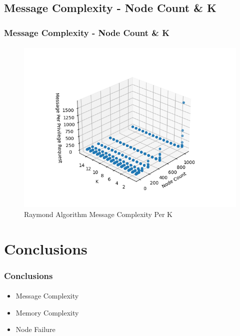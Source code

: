 \documentclass[11pt]{beamer}              %
\begin{document}
\subsection{Message Complexity - Node Count \& K}
\begin{frame}
\frametitle{Message Complexity - Node Count \& K}
\framesubtitle{}
\begin{figure}
    \centering
    \includegraphics[scale=0.5]{figures/RaymondAlgorithmMessageComplexityPerK.png}
    \caption{Raymond Algorithm Message Complexity Per K}
    \label{fig:raymond_algoritm_message_complexity_per_k}
\end{figure}
\end{frame}

\section{Conclusions}
\begin{frame}
\frametitle{Conclusions}
\framesubtitle{}
\begin{itemize}
    \item Message Complexity
    \item Memory Complexity
    \item Node Failure
\end{itemize}

\end{frame}

\thankslide
\end{document}
